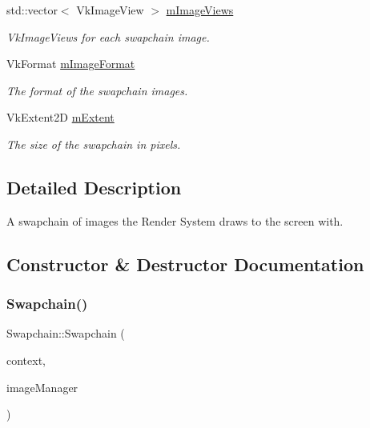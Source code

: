\begin{DoxyCompactItemize}
std\+::vector$<$ Vk\+Image\+View $>$ \mbox{\hyperlink{class_swapchain_a80d5a80de6cf5c9392ea712429b57534}{m\+Image\+Views}}
\begin{DoxyCompactList}\small\item\em Vk\+Image\+Views for each swapchain image. \end{DoxyCompactList}\item 
\mbox{\label{class_swapchain_a514df77ad1a92fe9694f9bc078d65cfc}} 
Vk\+Format \mbox{\hyperlink{class_swapchain_a514df77ad1a92fe9694f9bc078d65cfc}{m\+Image\+Format}}
\begin{DoxyCompactList}\small\item\em The format of the swapchain images. \end{DoxyCompactList}\item 
\mbox{\label{class_swapchain_af5d006713e38f4a1338fc5c6ec3d5c4c}} 
Vk\+Extent2D \mbox{\hyperlink{class_swapchain_af5d006713e38f4a1338fc5c6ec3d5c4c}{m\+Extent}}
\begin{DoxyCompactList}\small\item\em The size of the swapchain in pixels. \end{DoxyCompactList}\end{DoxyCompactItemize}


\subsection{Detailed Description}
A swapchain of images the Render System draws to the screen with. 

\subsection{Constructor \& Destructor Documentation}
\mbox{\label{class_swapchain_aa065edb67794f690216311dff191d030}} 
\subsubsection{\texorpdfstring{Swapchain()}{Swapchain()}}
{\footnotesize\ttfamily Swapchain\+::\+Swapchain (\begin{DoxyParamCaption}\item[{std\+::shared\+\_\+ptr$<$ \mbox{\hyperlink{class_vulkan_context}{Vulkan\+Context}} $>$}]{context,  }\item[{std\+::shared\+\_\+ptr$<$ \mbox{\hyperlink{class_image_manager}{Image\+Manager}} $>$}]{image\+Manager }\end{DoxyParamCaption})}



